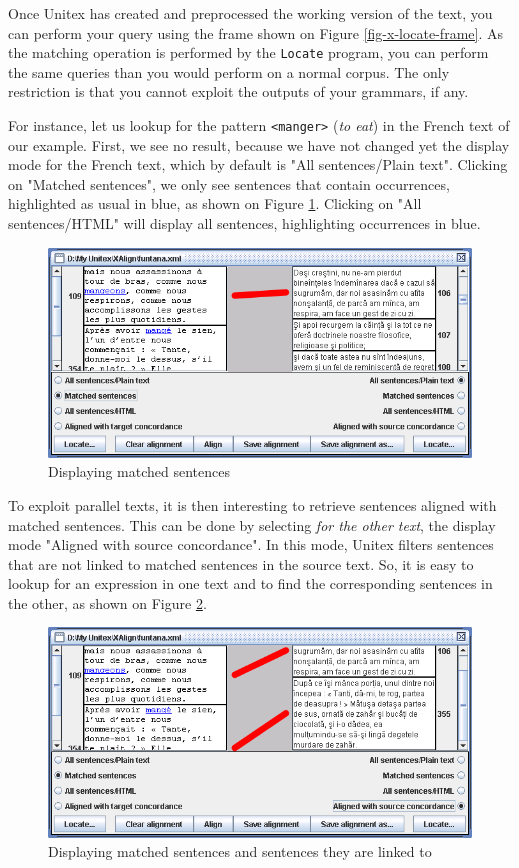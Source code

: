 \bigskip
\noindent Once Unitex has created and preprocessed the working version of the
text, you can perform your query using the frame shown on Figure
\ref{fig-x-locate-frame}. As the matching operation is performed by the
\verb+Locate+ program, you can perform the same queries
than you would perform on a normal corpus. The only restriction is that you
cannot exploit the outputs of your grammars, if any.

\bigskip
\noindent For instance, let us lookup for the pattern \verb+<manger>+ 
(\textit {to eat}) in the French text of our example. First, we see no result,
because we have not changed yet the display mode for the French text, which 
by default is "All sentences/Plain text". Clicking on "Matched sentences", 
we only see sentences that contain occurrences, highlighted as usual in blue,
as shown on Figure \ref{fig-x-concord}. Clicking on "All sentences/HTML" will
display all sentences, highlighting occurrences in blue. 

\begin{figure}[!ht]
\begin{center}
\includegraphics[width=15.5cm]{resources/img/figX-8.png}
\caption{Displaying matched sentences\label{fig-x-concord}}
\end{center}
\end{figure}

\bigskip
\noindent To exploit parallel texts, it is then interesting to retrieve
sentences aligned with matched sentences. This can be done by selecting
\textit{for the other text}, the display mode "Aligned with source
concordance". In this mode, Unitex filters sentences that are not linked
to matched sentences in the source text. So, it is easy to lookup for an
expression in one text and to find the corresponding sentences in the other,
as shown on Figure \ref{fig-x-concord-aligned}.

\begin{figure}[!ht]
\begin{center}
\includegraphics[width=15.5cm]{resources/img/figX-9.png}
\caption{Displaying matched sentences and sentences
they are linked to\label{fig-x-concord-aligned}}
\end{center}
\end{figure}
